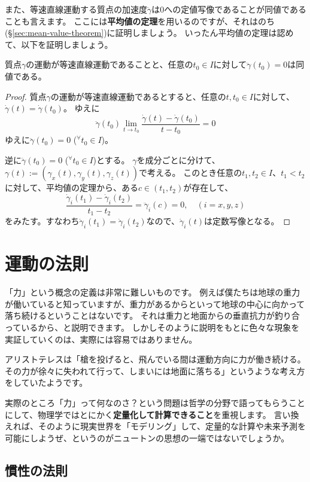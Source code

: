 また、等速直線運動する質点の加速度$\ddot\gamma$は0への定値写像であることが同値であることも言えます。
ここには\textbf{平均値の定理}を用いるのですが、それはのち(§\ref{sec:mean-value-theorem})に証明しましょう。
いったん平均値の定理は認めて、以下を証明しましょう。
\begin{theorem}
  質点$\gamma$の運動が等速直線運動であることと、任意の$t_0\in I$に対して$\ddot\gamma(t_0)=0$は同値である。
\end{theorem}
\begin{proof}
  質点$\gamma$の運動が等速直線運動であるとすると、任意の$t,t_0\in I$に対して、$\dot\gamma(t)=\dot\gamma(t_0)$。
  ゆえに
  \[
    \ddot\gamma(t_0)\lim_{t\to t_0}\frac{\dot\gamma(t)-\dot\gamma(t_0)}{t-t_0}=0
  \]
  ゆえに$\ddot\gamma(t_0)=0$ (${}^\forall t_0\in I$)。

  逆に$\ddot\gamma(t_0)=0$ (${}^\forall t_0\in I$)とする。
  $\gamma$を成分ごとに分けて、$\gamma(t):=(\gamma_x(t),\gamma_y(t),\gamma_z(t))$で考える。
  このとき任意の$t_1,t_2\in I$、$t_1<t_2$に対して、平均値の定理から、ある$c\in(t_1,t_2)$が存在して、
  \[
    \frac{\dot\gamma_i(t_1)-\dot\gamma_i(t_2)}{t_1-t_2}=\ddot\gamma_i(c)=0,\quad(i=x,y,z)
  \]
  をみたす。すなわち$\dot\gamma_i(t_1)=\dot\gamma_i(t_2)$なので、$\dot\gamma_i(t)$は定数写像となる。
\end{proof}



\section{運動の法則}

「力」という概念の定義は非常に難しいものです。
例えば僕たちは地球の重力が働いていると知っていますが、重力があるからといって地球の中心に向かって落ち続けるということはないです。
それは重力と地面からの垂直抗力が釣り合っているから、と説明できます。
しかしそのように説明をもとに色々な現象を実証していくのは、実際には容易ではありません。

アリストテレスは「槍を投げると、飛んでいる間は運動方向に力が働き続ける。その力が徐々に失われて行って、しまいには地面に落ちる」というような考え方をしていたようです。

実際のところ「力」って何なのさ？という問題は哲学の分野で語ってもらうことにして、物理学ではとにかく\textbf{定量化して計算できること}を重視します。
言い換えれば、そのように現実世界を「モデリング」して、定量的な計算や未来予測を可能にしようぜ、というのがニュートンの思想の一端ではないでしょうか。

\subsection{慣性の法則}

